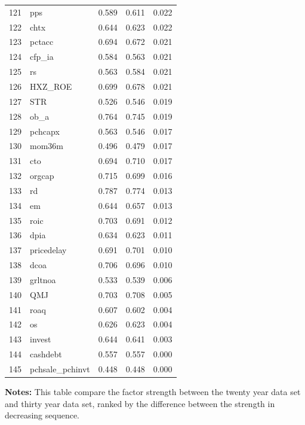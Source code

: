\documentclass[12pt]{article}
\begin{document}
\begin{footnotesize}
\begin{longtable}{rl|c|c|c}
		121 & pps & 0.589 & 0.611 & 0.022 \\ 
		122 & chtx & 0.644 & 0.623 & 0.022 \\ 
		123 & pctacc & 0.694 & 0.672 & 0.021 \\ 
		124 & cfp\_ia & 0.584 & 0.563 & 0.021 \\ 
		125 & rs & 0.563 & 0.584 & 0.021 \\ 
		126 & HXZ\_ROE & 0.699 & 0.678 & 0.021 \\ 
		127 & STR & 0.526 & 0.546 & 0.019 \\ 
		128 & ob\_a & 0.764 & 0.745 & 0.019 \\ 
		129 & pchcapx & 0.563 & 0.546 & 0.017 \\ 
		130 & mom36m & 0.496 & 0.479 & 0.017 \\ 
		131 & cto & 0.694 & 0.710 & 0.017 \\ 
		132 & orgcap & 0.715 & 0.699 & 0.016 \\ 
		133 & rd & 0.787 & 0.774 & 0.013 \\ 
		134 & em & 0.644 & 0.657 & 0.013 \\ 
		135 & roic & 0.703 & 0.691 & 0.012 \\ 
		136 & dpia & 0.634 & 0.623 & 0.011 \\ 
		137 & pricedelay & 0.691 & 0.701 & 0.010 \\ 
		138 & dcoa & 0.706 & 0.696 & 0.010 \\ 
		139 & grltnoa & 0.533 & 0.539 & 0.006 \\ 
		140 & QMJ & 0.703 & 0.708 & 0.005 \\ 
		141 & roaq & 0.607 & 0.602 & 0.004 \\ 
		142 & os & 0.626 & 0.623 & 0.004 \\ 
		143 & invest & 0.644 & 0.641 & 0.003 \\ 
		144 & cashdebt & 0.557 & 0.557 & 0.000 \\ 
		145 & pchsale\_pchinvt & 0.448 & 0.448 & 0.000 \\ 
		\hline
		
	\end{longtable}

			\begin{minipage}{0.7\textwidth}
	{\footnotesize {\bf Notes:} 	This table compare the factor strength between the twenty year data set and thirty year data set, ranked by the difference between the strength in decreasing sequence.}
\end{minipage}

\end{footnotesize}
\end{document}
